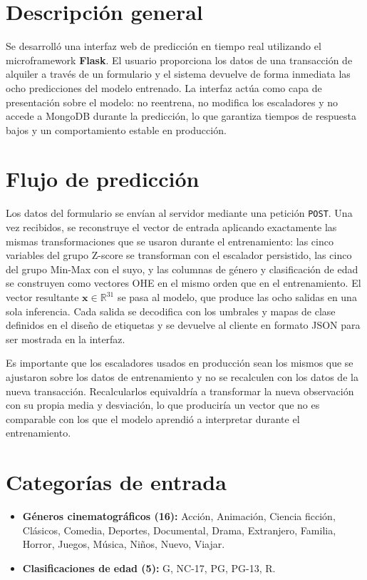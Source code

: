 \documentclass[12pt, a4paper]{report}
\begin{document}
\section{Descripción general}

Se desarrolló una interfaz web de predicción en tiempo real utilizando el microframework \textbf{Flask}. El usuario proporciona los datos de una transacción de alquiler a través de un formulario y el sistema devuelve de forma inmediata las ocho predicciones del modelo entrenado. La interfaz actúa como capa de presentación sobre el modelo: no reentrena, no modifica los escaladores y no accede a MongoDB durante la predicción, lo que garantiza tiempos de respuesta bajos y un comportamiento estable en producción.

\section{Flujo de predicción}

Los datos del formulario se envían al servidor mediante una petición \texttt{POST}. Una vez recibidos, se reconstruye el vector de entrada aplicando exactamente las mismas transformaciones que se usaron durante el entrenamiento: las cinco variables del grupo Z-score se transforman con el escalador persistido, las cinco del grupo Min-Max con el suyo, y las columnas de género y clasificación de edad se construyen como vectores OHE en el mismo orden que en el entrenamiento. El vector resultante $\mathbf{x} \in \mathbb{R}^{31}$ se pasa al modelo, que produce las ocho salidas en una sola inferencia. Cada salida se decodifica con los umbrales y mapas de clase definidos en el diseño de etiquetas y se devuelve al cliente en formato JSON para ser mostrada en la interfaz.

Es importante que los escaladores usados en producción sean los mismos que se ajustaron sobre los datos de entrenamiento y no se recalculen con los datos de la nueva transacción. Recalcularlos equivaldría a transformar la nueva observación con su propia media y desviación, lo que produciría un vector que no es comparable con los que el modelo aprendió a interpretar durante el entrenamiento.

\section{Categorías de entrada}

\begin{itemize}
  \item \textbf{Géneros cinematográficos (16):} Acción, Animación, Ciencia ficción, Clásicos, Comedia, Deportes, Documental, Drama, Extranjero, Familia, Horror, Juegos, Música, Niños, Nuevo, Viajar.
  \item \textbf{Clasificaciones de edad (5):} G, NC-17, PG, PG-13, R.
\end{itemize}
\end{document}
